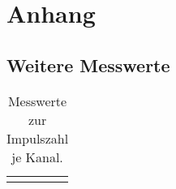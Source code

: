 \section{Anhang}
\subsection{Weitere Messwerte}

\begin{longtable}{S S}
\caption{Messwerte zur Impulszahl je Kanal.}
\label{tab:3_lebensdauer} \\
\end{longtable}
